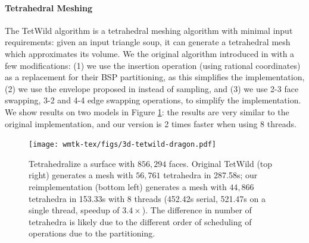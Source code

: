 \paragraph{Tetrahedral Meshing}

The TetWild algorithm is a tetrahedral meshing algorithm with minimal input requirements: given an input triangle soup, it can generate a tetrahedral mesh which approximates its volume. We  the original algorithm introduced in \cite{hu2018tetrahedral,Hu:2019:fTetWild} with a few modifications: (1) we use the insertion operation \cite{Hu:2019:fTetWild} (using rational coordinates) as a replacement for their BSP partitioning, as this simplifies the implementation, (2) we use the envelope proposed in \cite{Wang:2020:FE} instead of sampling, and (3) we use 2-3 face swapping, 3-2 and 4-4 edge swapping operations, to simplify the implementation. We show results on two models in Figure \ref{fig:tetwild}: the results are very similar to the original implementation, and our version is 2 times faster when using 8 threads. 




\begin{figure}
    \centering\footnotesize
    \texttt{[image: wmtk-tex/figs/3d-tetwild-dragon.pdf]}
    \caption{Tetrahedralize a surface with $856,294$ faces. Original TetWild (top right) generates a mesh with $56,761$ tetrahedra in 287.58s; our reimplementation (bottom left) generates a mesh with $44,866$ tetrahedra in 153.33s with 8 threads (452.42s serial, 521.47s on a single thread, speedup of $3.4\times$). The difference in number of tetrahedra is likely due to the different order of scheduling of operations due to the partitioning.}
    \label{fig:tetwild}
\end{figure}


